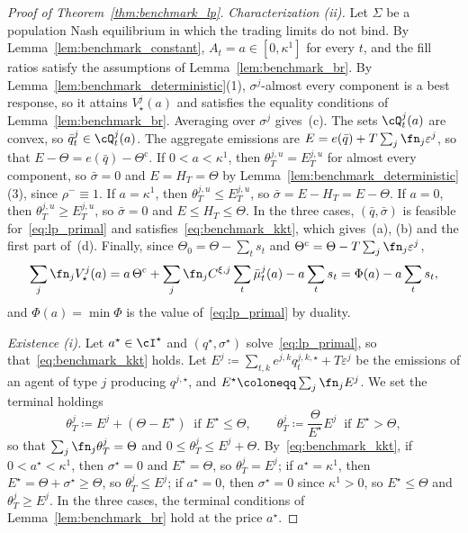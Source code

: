 \begin{proof}[Proof of Theorem~\ref{thm:benchmark_lp}]
        \emph{Characterization (ii).} Let $\Sigma$ be a population Nash equilibrium in which the trading limits do not bind. By Lemma~\ref{lem:benchmark_constant}, $A_t = a \in [0, \kappa^1]$ for every $t$, and the fill ratios satisfy the assumptions of Lemma~\ref{lem:benchmark_br}. By Lemma~\ref{lem:benchmark_deterministic}(1), $\sigma^j$-almost every component is a best response, so it attains $V^j_\star(a)$ and satisfies the equality conditions of Lemma~\ref{lem:benchmark_br}. Averaging over $\sigma^j$ gives~(c). The sets $\cQ^j_t(a)$ are convex, so $\bar q^j_t \in \cQ^j_t(a)$. The aggregate emissions are $E = e(\bar q) + T\sum_j \fn_j \varepsilon^j$, so that $E - \Theta = e(\bar q) - \Theta^{\mathrm c}$. If $0 < a < \kappa^1$, then $\theta^{j,u}_T = E^{j,u}_T$ for almost every component, so $\bar\sigma = 0$ and $E = H_T = \Theta$ by Lemma~\ref{lem:benchmark_deterministic}(3), since $\rho^- \equiv 1$. If $a = \kappa^1$, then $\theta^{j,u}_T \le E^{j,u}_T$, so $\bar\sigma = E - H_T = E - \Theta$. If $a = 0$, then $\theta^{j,u}_T \ge E^{j,u}_T$, so $\bar\sigma = 0$ and $E \le H_T \le \Theta$. In the three cases, $(\bar q, \bar\sigma)$ is feasible for~\eqref{eq:lp_primal} and satisfies~\eqref{eq:benchmark_kkt}, which gives~(a), (b) and the first part of~(d). Finally, since $\Theta_0 = \Theta - \sum_t s_t$ and $\Theta^{\mathrm c} = \Theta - T \sum_j \fn_j \varepsilon^j$,
        $$
            \sum_{j} \fn_j V^j_\star(a) = a\, \Theta^{\mathrm c} + \sum_j \fn_j C^{\xi,j} \sum_t \bar\mu^j_t(a) - a \sum_t s_t = \Phi(a) - a \sum_t s_t,
        $$
        and $\Phi(a) = \min \Phi$ is the value of~\eqref{eq:lp_primal} by duality.

        \emph{Existence (i).} Let $a^\star \in \cI^\star$ and $(q^\star, \sigma^\star)$ solve~\eqref{eq:lp_primal}, so that~\eqref{eq:benchmark_kkt} holds. Let $E^j \coloneqq \sum_{t,k} e^{j,k} q^{j,k,\star}_t + T\varepsilon^j$ be the emissions of an agent of type $j$ producing $q^{j,\star}$, and $E^\star \coloneqq \sum_j \fn_j E^j$. We set the terminal holdings
        $$
            \theta^j_T \coloneqq E^j + (\Theta - E^\star) \ \text{ if } E^\star \le \Theta, \qquad \theta^j_T \coloneqq \frac{\Theta}{E^\star} E^j \ \text{ if } E^\star > \Theta,
        $$
        so that $\sum_j \fn_j \theta^j_T = \Theta$ and $0 \le \theta^j_T \le E^j + \Theta$. By~\eqref{eq:benchmark_kkt}, if $0 < a^\star < \kappa^1$, then $\sigma^\star = 0$ and $E^\star = \Theta$, so $\theta^j_T = E^j$; if $a^\star = \kappa^1$, then $E^\star = \Theta + \sigma^\star \ge \Theta$, so $\theta^j_T \le E^j$; if $a^\star = 0$, then $\sigma^\star = 0$ since $\kappa^1 > 0$, so $E^\star \le \Theta$ and $\theta^j_T \ge E^j$. In the three cases, the terminal conditions of Lemma~\ref{lem:benchmark_br} hold at the price $a^\star$.


\end{proof}
